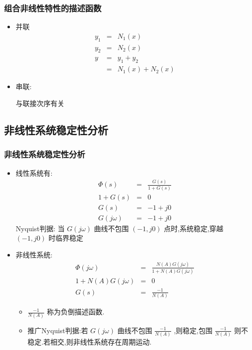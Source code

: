 \documentclass[table]{article}
\begin{document}
\begin{frame}
\frametitle{组合非线性特性的描述函数}
\label{sec-2-2-6}

\begin{itemize}
\item 并联
      \begin{eqnarray*}
      y_1 & = & N_1(x)\\
      y_2 &=& N_2(x) \\
      y &=& y_1+y_2 \\
       	&=& N_1(x)+N_2(x)
      \end{eqnarray*}
\item <2->串联:

      与联接次序有关
\end{itemize}
\end{frame}
\subsection{非线性系统稳定性分析}
\label{sec-2-3}
\begin{frame}
\frametitle{非线性系统稳定性分析}
\label{sec-2-3-1}
\begin{itemize}

\item 线性系统有:\\
\label{sec-2-3-1-1}%
\begin{eqnarray*}
      \Phi(s) &=& \frac{G(s)}{1+G(s)} \\
      1+G(s) &=& 0 \\
      G(s) &=& -1+j0 \\
      G(j\omega) &=& -1+j0
      \end{eqnarray*}
      Nyquist判据: 当  $G(j\omega)$ 曲线不包围 $(-1,j0)$ 点时,系统稳定,穿越 $(-1,j0)$ 时临界稳定

\item 非线性系统:\\
\label{sec-2-3-1-2}%
\begin{eqnarray*}
      \Phi(j\omega) &=& \frac{N(A)G(j\omega)}{1+N(A)G(j\omega)} \\
      1+N(A)G(j\omega) &=& 0 \\
      G(s) &=& \frac{-1}{N(A)} 
      \end{eqnarray*}
\begin{itemize}
\item $\frac{-1}{N(A)}$ 称为负倒描述函数.
\item <3-> 推广Nyquist判据:若  $G(j\omega)$  曲线不包围  $\frac{-1}{N(A)}$ ,则稳定,包围  $\frac{-1}{N(A)}$  则不稳定.若相交,则非线性系统存在周期运动.
\end{itemize}
\end{itemize} %
\end{frame}
\end{document}
